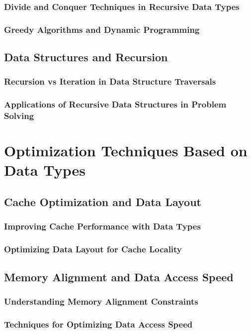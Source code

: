 \documentclass[12pt, oneside]{book}
\begin{document}
\subsubsection{Divide and Conquer Techniques in Recursive Data Types}
\subsubsection{Greedy Algorithms and Dynamic Programming}
\subsection{Data Structures and Recursion}
\subsubsection{Recursion vs Iteration in Data Structure Traversals}
\subsubsection{Applications of Recursive Data Structures in Problem Solving}
\section{Optimization Techniques Based on Data Types}
\subsection{Cache Optimization and Data Layout}
\subsubsection{Improving Cache Performance with Data Types}
\subsubsection{Optimizing Data Layout for Cache Locality}
\subsection{Memory Alignment and Data Access Speed}
\subsubsection{Understanding Memory Alignment Constraints}
\subsubsection{Techniques for Optimizing Data Access Speed}
\end{document}
